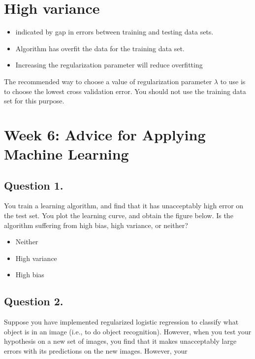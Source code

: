 \documentclass[11pt]{article} %
\begin{document}




\section*{High variance}

\begin{itemize}
	\item indicated by gap in errors between training and testing data sets.
	\item Algorithm has overfit the data for the training data set.
	\item Increasing the regularization parameter will reduce overfitting
\end{itemize}
The recommended way to choose a value of regularization parameter $\lambda$ to use is to choose
the lowest cross validation error.
You should not use the training data set for this purpose.

\section{Week 6: Advice for Applying Machine Learning}

\subsection*{Question 1. }
You train a learning algorithm, and find that it has unacceptably high error on the test set. You plot the learning curve, and obtain the figure below. Is the algorithm suffering from high bias, high variance, or neither?

\begin{itemize}
	\item Neither
	
	\item High variance
	
	\item High bias
\end{itemize}


\subsection*{Question 2. }
Suppose you have implemented regularized logistic regression  to classify what object is in an image (i.e., to do object recognition). However, when you test your hypothesis on a new set of images, you find that it makes unacceptably large 
errors with its predictions on the new images. However, your
\end{document}
